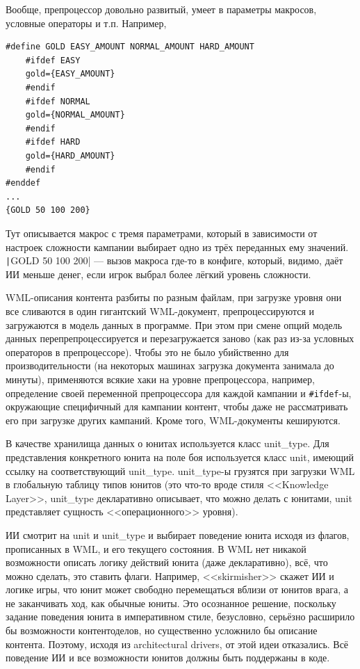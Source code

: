 \documentclass[a5paper]{article}
\begin{document}
Вообще, препроцессор довольно развитый, умеет в параметры макросов, условные операторы и т.п. Например,

\begin{verbatim}
#define GOLD EASY_AMOUNT NORMAL_AMOUNT HARD_AMOUNT
    #ifdef EASY
    gold={EASY_AMOUNT}
    #endif
    #ifdef NORMAL
    gold={NORMAL_AMOUNT}
    #endif
    #ifdef HARD
    gold={HARD_AMOUNT}
    #endif
#enddef
...
{GOLD 50 100 200}
\end{verbatim}

Тут описывается макрос с тремя параметрами, который в зависимости от настроек сложности кампании выбирает одно из трёх переданных ему значений. \texttt|{GOLD 50 100 200}| --- вызов макроса где-то в конфиге, который, видимо, даёт ИИ меньше денег, если игрок выбрал более лёгкий уровень сложности.

WML-описания контента разбиты по разным файлам, при загрузке уровня они все сливаются в один гигантский WML-документ, препроцессируются и загружаются в модель данных в программе. При этом при смене опций модель данных перепрепроцессируется и перезагружается заново (как раз из-за условных операторов в препроцессоре). Чтобы это не было убийственно для производительности (на некоторых машинах загрузка документа занимала до минуты), применяются всякие хаки на уровне препроцессора, например, определение своей переменной препроцессора для каждой кампании и \texttt{#ifdef}-ы, окружающие специфичный для кампании контент, чтобы даже не рассматривать его при загрузке других кампаний. Кроме того, WML-документы кешируются.

В качестве хранилища данных о юнитах используется класс unit\_type. Для представления конкретного юнита на поле боя используется класс unit, имеющий ссылку на соответствующий unit\_type. unit\_type-ы грузятся при загрузки WML в глобальную таблицу типов юнитов (это что-то вроде стиля <<Knowledge Layer>>, unit\_type декларативно описывает, что можно делать с юнитами, unit представляет сущность <<операционного>> уровня). 

ИИ смотрит на unit и unit\_type и выбирает поведение юнита исходя из флагов, прописанных в WML, и его текущего состояния. В WML нет никакой возможности описать логику действий юнита (даже декларативно), всё, что можно сделать, это ставить флаги. Например, <<skirmisher>> скажет ИИ и логике игры, что юнит может свободно перемещаться вблизи от юнитов врага, а не заканчивать ход, как обычные юниты. Это осознанное решение, поскольку задание поведения юнита в императивном стиле, безусловно, серьёзно расширило бы возможности контентоделов, но существенно усложнило бы описание контента. Поэтому, исходя из architectural drivers, от этой идеи отказались. Всё поведение ИИ и все возможности юнитов должны быть поддержаны в коде.
\end{document}
